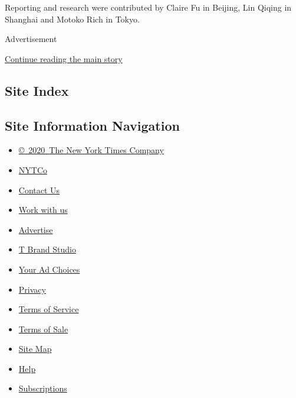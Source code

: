 Reporting and research were contributed by Claire Fu in Beijing, Lin
Qiqing in Shanghai and Motoko Rich in Tokyo.

Advertisement

\protect\hyperlink{after-bottom}{Continue reading the main story}

\hypertarget{site-index}{%
\subsection{Site Index}\label{site-index}}

\hypertarget{site-information-navigation}{%
\subsection{Site Information
Navigation}\label{site-information-navigation}}

\begin{itemize}
\tightlist
\item
  \href{https://help.nytimes.com/hc/en-us/articles/115014792127-Copyright-notice}{©~2020~The
  New York Times Company}
\end{itemize}

\begin{itemize}
\tightlist
\item
  \href{https://www.nytco.com/}{NYTCo}
\item
  \href{https://help.nytimes.com/hc/en-us/articles/115015385887-Contact-Us}{Contact
  Us}
\item
  \href{https://www.nytco.com/careers/}{Work with us}
\item
  \href{https://nytmediakit.com/}{Advertise}
\item
  \href{http://www.tbrandstudio.com/}{T Brand Studio}
\item
  \href{https://www.nytimes.com/privacy/cookie-policy\#how-do-i-manage-trackers}{Your
  Ad Choices}
\item
  \href{https://www.nytimes.com/privacy}{Privacy}
\item
  \href{https://help.nytimes.com/hc/en-us/articles/115014893428-Terms-of-service}{Terms
  of Service}
\item
  \href{https://help.nytimes.com/hc/en-us/articles/115014893968-Terms-of-sale}{Terms
  of Sale}
\item
  \href{https://spiderbites.nytimes.com}{Site Map}
\item
  \href{https://help.nytimes.com/hc/en-us}{Help}
\item
  \href{https://www.nytimes.com/subscription?campaignId=37WXW}{Subscriptions}
\end{itemize}
